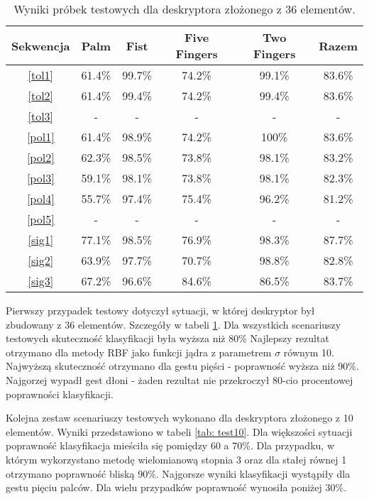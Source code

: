 \begin{table} [h!]
	\centering
	\begin{tabular}{|c|c|c|c|c|c|}
		\hline
		\textbf{Sekwencja} 	& \textbf{Palm} & \textbf{Fist} & \textbf{Five Fingers} & \textbf{Two Fingers} & \textbf{Razem} \\ \hline
		\ref{tol1} 	& 61.4\% 	& 99.7\%	& 74.2\%	& 99.1\% 	& 83.6\% \\ \hline
		\ref{tol2} 	& 61.4\% 	& 99.4\%	& 74.2\%	& 99.4\% 	& 83.6\% \\ \hline
		\ref{tol3}	& -			& -			& -			& - 		& - 	 \\ \hline \hline
		\ref{pol1} 	& 61.4\% 	& 98.9\%	& 74.2\%	& 100\% 	& 83.6\% \\ \hline
		\ref{pol2} 	& 62.3\% 	& 98.5\%	& 73.8\%	& 98.1\% 	& 83.2\% \\ \hline
		\ref{pol3}	& 59.1\%	& 98.1\%	& 73.8\%	& 98.1\% 	& 82.3\% \\ \hline
		\ref{pol4}	& 55.7\%	& 97.4\%	& 75.4\%	& 96.2\% 	& 81.2\% \\ \hline
		\ref{pol5}	& -			& -			& -			& - 		& - 	 \\ \hline \hline
		\ref{sig1}	& 77.1\% 	& 98.5\%	& 76.9\%	& 98.3\% 	& 87.7\% \\ \hline
		\ref{sig2}	& 63.9\% 	& 97.7\%	& 70.7\%	& 98.8\% 	& 82.8\% \\ \hline
		\ref{sig3}	& 67.2\%	& 96.6\%	& 84.6\%	& 86.5\% 	& 83.7\% \\ \hline
	\end{tabular}
	\caption{Wyniki próbek testowych dla deskryptora złożonego z 36 elementów.}
	\label{tab: test36}
\end{table}

Pierwszy przypadek testowy dotyczył sytuacji, w której deskryptor był zbudowany z 36 elementów. Szczegóły w tabeli \ref{tab: test36}. Dla wszystkich scenariuszy testowych skuteczność klasyfikacji była wyższa niż 80\% Najlepszy rezultat otrzymano dla metody RBF jako funkcji jądra z parametrem $\sigma$ równym 10. Najwyższą skuteczność otrzymano dla gestu pięści - poprawność wyższa niż 90\%. Najgorzej wypadł gest dłoni - żaden rezultat nie przekroczył 80-cio procentowej poprawności klasyfikacji.  

Kolejna zestaw scenariuszy testowych wykonano dla deskryptora złożonego z 10 elementów. Wyniki przedstawiono w tabeli \ref{tab: test10}. Dla większości sytuacji poprawność klasyfikacja mieściła się pomiędzy 60 a 70\%. Dla przypadku, w którym wykorzystano metodę wielomianową stopnia 3 oraz dla stałej równej 1 otrzymano poprawność bliską 90\%. Najgorsze wyniki klasyfikacji wystąpiły dla gestu pięciu palców. Dla wielu przypadków poprawność wynosiła poniżej 30\%. 

